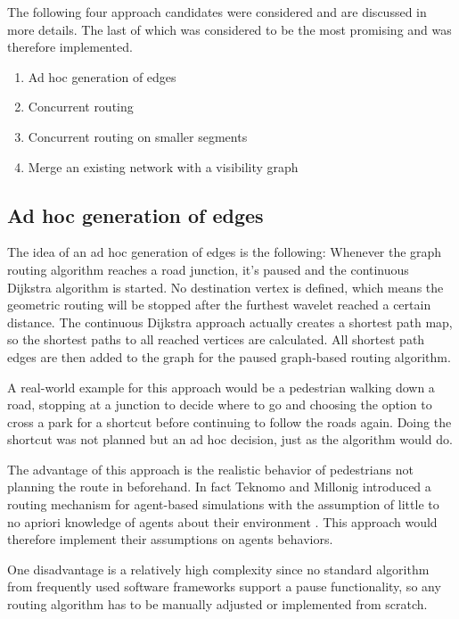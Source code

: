 	The following four approach candidates were considered and are discussed in more details.
	The last of which was considered to be the most promising and was therefore implemented.
	\begin{enumerate}
		\item Ad hoc generation of edges
		\item Concurrent routing
		\item Concurrent routing on smaller segments
		\item Merge an existing network with a visibility graph
	\end{enumerate}
	
	\subsection{Ad hoc generation of edges}
	
		The idea of an ad hoc generation of edges is the following:
		Whenever the graph routing algorithm reaches a road junction, it's paused and the continuous Dijkstra algorithm is started.
		No destination vertex is defined, which means the geometric routing will be stopped after the furthest wavelet reached a certain distance.
		The continuous Dijkstra approach actually creates a shortest path map, so the shortest paths to all reached vertices are calculated.
		All shortest path edges are then added to the graph for the paused graph-based routing algorithm.
		
		A real-world example for this approach would be a pedestrian walking down a road, stopping at a junction to decide where to go and choosing the option to cross a park for a shortcut before continuing to follow the roads again.
		Doing the shortcut was not planned but an ad hoc decision, just as the algorithm would do.
		
		The advantage of this approach is the realistic behavior of pedestrians not planning the route in beforehand.
		In fact Teknomo and Millonig introduced a routing mechanism for agent-based simulations with the assumption of little to no apriori knowledge of agents about their environment \cite{teknomo-millonig-routing}.
		This approach would therefore implement their assumptions on agents behaviors.
		
		One disadvantage is a relatively high complexity since no standard algorithm from frequently used software frameworks support a pause functionality, so any routing algorithm has to be manually adjusted or implemented from scratch.
		
